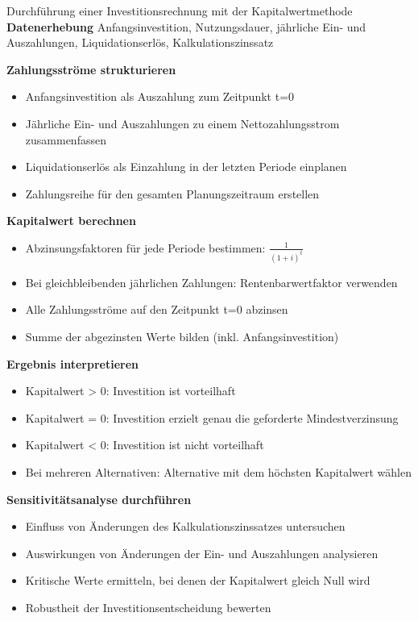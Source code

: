 \begin{KR}{Durchführung einer Investitionsrechnung mit der Kapitalwertmethode}\\
\textbf{Datenerhebung}
Anfangsinvestition, Nutzungsdauer, jährliche Ein- und Auszahlungen, Liquidationserlös, Kalkulationszinssatz

\textbf{Zahlungsströme strukturieren}
\begin{itemize}
    \item Anfangsinvestition als Auszahlung zum Zeitpunkt t=0
    \item Jährliche Ein- und Auszahlungen zu einem Nettozahlungsstrom zusammenfassen
    \item Liquidationserlös als Einzahlung in der letzten Periode einplanen
    \item Zahlungsreihe für den gesamten Planungszeitraum erstellen
\end{itemize}

\textbf{Kapitalwert berechnen}
\begin{itemize}
    \item Abzinsungsfaktoren für jede Periode bestimmen: $\frac{1}{(1+i)^t}$
    \item Bei gleichbleibenden jährlichen Zahlungen: Rentenbarwertfaktor verwenden
    \item Alle Zahlungsströme auf den Zeitpunkt t=0 abzinsen
    \item Summe der abgezinsten Werte bilden (inkl. Anfangsinvestition)
\end{itemize}

\textbf{Ergebnis interpretieren}
\begin{itemize}
    \item Kapitalwert > 0: Investition ist vorteilhaft
    \item Kapitalwert = 0: Investition erzielt genau die geforderte Mindestverzinsung
    \item Kapitalwert < 0: Investition ist nicht vorteilhaft
    \item Bei mehreren Alternativen: Alternative mit dem höchsten Kapitalwert wählen
\end{itemize}

\textbf{Sensitivitätsanalyse durchführen}
\begin{itemize}
    \item Einfluss von Änderungen des Kalkulationszinssatzes untersuchen
    \item Auswirkungen von Änderungen der Ein- und Auszahlungen analysieren
    \item Kritische Werte ermitteln, bei denen der Kapitalwert gleich Null wird
    \item Robustheit der Investitionsentscheidung bewerten
\end{itemize}
\end{KR}